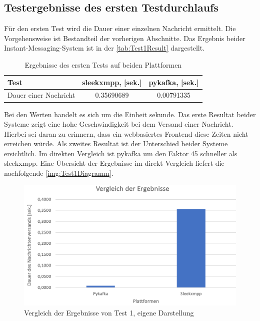 \documentclass[a4paper,titlepage,halfparskip,12pt]{scrreprt}
\begin{document}
\begin{onehalfspacing}
\subsection*{Testergebnisse des ersten Testdurchlaufs}
Für den ersten Test wird die Dauer einer einzelnen Nachricht ermittelt. Die Vorgehensweise ist Bestandteil der vorherigen Abschnitte. Das Ergebnis beider Instant-Messaging-System ist in der \autoref{tab:Test1Result} dargestellt.
\begin{table}[h]
	\centering
	\caption{Ergebnisse des ersten Tests auf beiden Plattformen}
	\begin{tabular}{l|c|c}
		\textbf{Test} & \textbf{sleekxmpp, [sek.]} & \textbf{pykafka, [sek.]} \\
		\hline
		Dauer einer Nachricht & 0.35690689 & 0.00791335 \\
	\end{tabular}
	\label{tab:Test1Result}
\end{table}
Bei den Werten handelt es sich um die Einheit sekunde. Das erste Resultat beider Systeme zeigt eine hohe Geschwindigkeit bei dem Versand einer Nachricht. Hierbei sei daran zu erinnern, dass ein webbasiertes Frontend diese Zeiten nicht erreichen würde. Als zweites Resultat ist der Unterschied beider Systeme ersichtlich. Im direkten Vergleich ist pykafka um den Faktor 45 schneller als sleekxmpp. Eine Übersicht der Ergebnisse im direkt Vergleich liefert die nachfolgende \autoref{img:Test1Diagramm}.
\begin{figure}[h]
	\centering
	\includegraphics[scale=0.55]{images/DiagrammTest1}
	\caption{Vergleich der Ergebnisse von Test 1, eigene Darstellung}
	\label{img:Test1Diagramm}
\end{figure}



\end{onehalfspacing}
\end{document}
